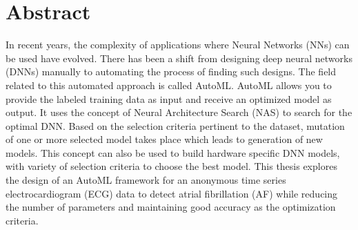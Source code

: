 
\clearpage
{}
\section*{Abstract}

\begin{center}
\begin{minipage}[t]{1.0\textwidth}
	In recent years, the complexity of applications where Neural Networks (NNs) can be used have evolved. There has been a shift from designing deep neural networks (DNNs) manually to automating the process of finding such designs. The field related to this automated approach is called AutoML. AutoML allows you to provide the labeled training data as input and receive an optimized model as output. It uses the concept of Neural Architecture Search (NAS) to search for the optimal DNN. Based on the selection criteria pertinent to the dataset, mutation of one or more selected model takes place which leads to generation of new models. This concept can also be used to build hardware specific DNN models, with variety of selection criteria to choose the best model. This thesis explores the design of an AutoML framework for an anonymous time series electrocardiogram (ECG) data to detect atrial fibrillation (AF) while reducing the number of parameters and maintaining good accuracy as the optimization criteria. 
\end{minipage}
\end{center}

\vfill



\vfill

\thispagestyle{empty}